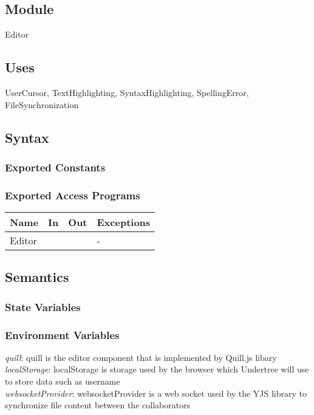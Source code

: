 \documentclass[12pt, titlepage]{article}
\begin{document}
	\subsection{Module}
	
	Editor
	
	\subsection{Uses}
	UserCursor, TextHighlighting, SyntaxHighlighting, SpellingError, FileSynchronization
	
	\subsection{Syntax}
	
	\subsubsection{Exported Constants}
	
	\subsubsection{Exported Access Programs}
	
	\begin{center}
		\begin{tabular}{p{2cm} p{4cm} p{4cm} p{2cm}}
			\hline
			\textbf{Name} & \textbf{In} & \textbf{Out} & \textbf{Exceptions} \\
			\hline
			Editor &  &  & - \\
			\hline
		\end{tabular}
	\end{center}
	
	\subsection{Semantics}
	
	\subsubsection{State Variables}
	
	
	\subsubsection{Environment Variables}
	
	\textit{quill}: quill is the editor component that is implemented by Quill.js libary\\
	\textit{localStorage}: localStorage is storage used by the browser which Undertree will use to store data such as username \\
	\textit{websocketProvider}: websocketProvider is a web socket used by the YJS library to synchronize file content between the collaborators
	
\end{document}
